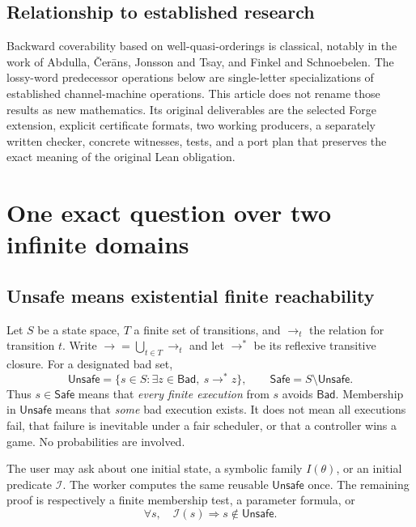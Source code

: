 \documentclass[11pt,a4paper]{article}
\theoremstyle{definition}
\newcommand{\Bad}{\mathsf{Bad}}
\newcommand{\Unsafe}{\mathsf{Unsafe}}
\newcommand{\Safe}{\mathsf{Safe}}
\begin{document}
\subsection{Relationship to established research}
Backward coverability based on well-quasi-orderings is classical, notably in
the work of Abdulla, \v{C}er\=ans, Jonsson and Tsay, and Finkel and
Schnoebelen.\cite{acjt,fs} The lossy-word predecessor operations below are
single-letter specializations of established channel-machine
operations.\cite{flat} This article does not rename those results as new
mathematics. Its original deliverables are the selected Forge extension,
explicit certificate formats, two working producers, a separately written
checker, concrete witnesses, tests, and a port plan that preserves the exact
meaning of the original Lean obligation.

\section{One exact question over two infinite domains}
\label{sec:semantics}

\subsection{Unsafe means existential finite reachability}
Let $S$ be a state space, $T$ a finite set of transitions, and $\to_t$ the
relation for transition $t$. Write $\to=\bigcup_{t\in T}\to_t$ and let
$\to^*$ be its reflexive transitive closure. For a designated bad set,
\begin{equation}
 \Unsafe = \{s\in S:\exists z\in\Bad,\ s\to^*z\},
 \qquad \Safe=S\setminus\Unsafe.
 \label{eq:unsafe}
\end{equation}
Thus $s\in\Safe$ means that \emph{every finite execution} from $s$ avoids
$\Bad$. Membership in $\Unsafe$ means that \emph{some} bad execution exists.
It does not mean all executions fail, that failure is inevitable under a fair
scheduler, or that a controller wins a game. No probabilities are involved.

The user may ask about one initial state, a symbolic family $I(\theta)$, or
an initial predicate $\mathcal I$. The worker computes the same reusable
$\Unsafe$ once. The remaining proof is respectively a finite membership test,
a parameter formula, or
\begin{equation}
 \forall s,\quad \mathcal I(s)\Longrightarrow s\notin\Unsafe.
 \label{eq:initcheck}
\end{equation}
\end{document}
